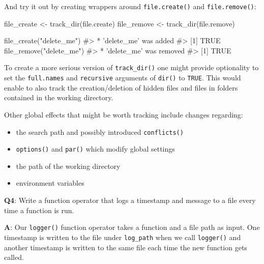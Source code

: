 \documentclass[
]{krantz}
\makeatletter
\newenvironment{Shaded}{\begin{snugshade}}{\end{snugshade}}
\newcommand{\CommentTok}[1]{\textcolor[rgb]{0.56,0.35,0.01}{\textit{#1}}}
\newcommand{\KeywordTok}[1]{\textcolor[rgb]{0.13,0.29,0.53}{\textbf{#1}}}
\newcommand{\NormalTok}[1]{#1}
\newcommand{\StringTok}[1]{\textcolor[rgb]{0.31,0.60,0.02}{#1}}
\providecommand{\tightlist}{%
  \setlength{\itemsep}{0pt}\setlength{\parskip}{0pt}}
\newenvironment{kframe}{%
\medskip{}
\setlength{\fboxsep}{.8em}
 \def\at@end@of@kframe{}%
 \ifinner\ifhmode%
  \def\at@end@of@kframe{\end{minipage}}%
  \begin{minipage}{\columnwidth}%
 \fi\fi%
 \def\FrameCommand##1{\hskip\@totalleftmargin \hskip-\fboxsep
 \colorbox{shadecolor}{##1}\hskip-\fboxsep
     \hskip-\linewidth \hskip-\@totalleftmargin \hskip\columnwidth}%
 \MakeFramed {\advance\hsize-\width
   \@totalleftmargin\z@ \linewidth\hsize
   \@setminipage}}%
 {\par\unskip\endMakeFramed%
 \at@end@of@kframe}
\renewenvironment{Shaded}{\begin{kframe}}{\end{kframe}}
\renewcommand{\KeywordTok} [1]{\textcolor[rgb]{0.00,0.44,0.13}{{#1}}}
\renewcommand{\StringTok}  [1]{\textcolor[rgb]{0.25,0.44,0.63}{{#1}}}
\renewcommand{\CommentTok} [1]{\textcolor[rgb]{0.38,0.63,0.69}{{#1}}}
\renewcommand{\NormalTok}  [1]{{#1}}
\makeatother
\begin{document}
And try it out by creating wrappers around \texttt{file.create()} and \texttt{file.remove()}:

\begin{Shaded}
\begin{Highlighting}[]
\NormalTok{file_create <-}\StringTok{ }\KeywordTok{track_dir}\NormalTok{(file.create)}
\NormalTok{file_remove <-}\StringTok{ }\KeywordTok{track_dir}\NormalTok{(file.remove)}

\KeywordTok{file_create}\NormalTok{(}\StringTok{"delete_me"}\NormalTok{)}
\CommentTok{#>  * 'delete_me' was added}
\CommentTok{#> [1] TRUE}
\KeywordTok{file_remove}\NormalTok{(}\StringTok{"delete_me"}\NormalTok{)}
\CommentTok{#>  * 'delete_me' was removed}
\CommentTok{#> [1] TRUE}
\end{Highlighting}
\end{Shaded}

To create a more serious version of \texttt{track\_dir()} one might provide optionality to set the \texttt{full.names} and \texttt{recursive} arguments of \texttt{dir()} to \texttt{TRUE}. This would enable to also track the creation/deletion of hidden files and files in folders contained in the working directory.

Other global effects that might be worth tracking include changes regarding:

\begin{itemize}
\tightlist
\item
  the search path and possibly introduced \texttt{conflicts()}
\item
  \texttt{options()} and \texttt{par()} which modify global settings
\item
  the path of the working directory
\item
  environment variables
\end{itemize}

\textbf{{Q4}}: Write a function operator that logs a timestamp and message to a file every time a function is run.

\textbf{{A}}: Our \texttt{logger()} function operator takes a function and a file path as input. One timestamp is written to the file under \texttt{log\_path} when we call \texttt{logger()} and another timestamp is written to the same file each time the new function gets called.
\end{document}
